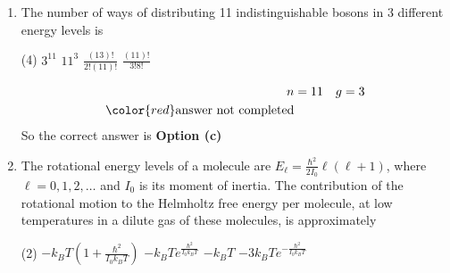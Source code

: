\begin{enumerate}
	{}
	\begin{tasks}(4)
		\task[\textbf{a.}] $1 / 3$
		\task[\textbf{b.}] $2 / 3$
	\end{tasks}
\begin{answer}
	\begin{align*}
	\intertext{$E \propto p^{s}$, where $p$ is momentum}
	P&=\frac{s}{3}\left(\frac{E}{V}\right),\text{ where $P$ is pressure}\\
	\frac{P}{E} &\propto \frac{s}{3}\\
	\text{In problem, }E \propto k^{3},\text{ so, }s&=3\\
	\text{	pressure }P&=\frac{3}{3}\left(\frac{E}{V}\right) \Rightarrow P \propto\left(\frac{E}{V}\right)\text{ at fixed $T$.}
	\end{align*}
	So the correct answer is \textbf{Option (c)}
\end{answer}
	\item The number of ways of distributing 11 indistinguishable bosons in 3 different energy levels is
	{}
	\begin{tasks}(4)
		\task[\textbf{a.}]  $3^{11}$
		\task[\textbf{b.}] $11^{3}$
		\task[\textbf{c.}] $\frac{(13) !}{2 !(11) !}$
		\task[\textbf{d.}]  $\frac{(11) !}{3 ! 8 !}$
	\end{tasks}
\begin{answer}
	\begin{align*}
	n&=11 \quad g=3\\
	\color{red}\text{answer not completed}
	\end{align*}
	So the correct answer is \textbf{Option (c)}
\end{answer}
	\item The rotational energy levels of a molecule are $E_{\ell}=\frac{\hbar^{2}}{2 I_{0}} \ell(\ell+1)$, where $\ell=0,1,2, \ldots$ and $I_{0}$ is its moment of inertia. The contribution of the rotational motion to the Helmholtz free energy per molecule, at low temperatures in a dilute gas of these molecules, is approximately
	{}
	\begin{tasks}(2)
		\task[\textbf{a.}]  $-k_{B} T\left(1+\frac{\hbar^{2}}{I_{0} k_{B} T}\right)$
		\task[\textbf{b.}] $-k_{B} T e^{\frac{\hbar^{2}}{I_{0} k_{B} T}}$
		\task[\textbf{c.}] $-k_{B} T$
		\task[\textbf{d.}] $-3 k_{B} T e^{-\frac{\hbar^{2}}{I_{0} k_{B} T}}$
	\end{tasks} 
\begin{answer}
	\begin{align*}

\end{align*}
\end{answer}
\end{enumerate}
